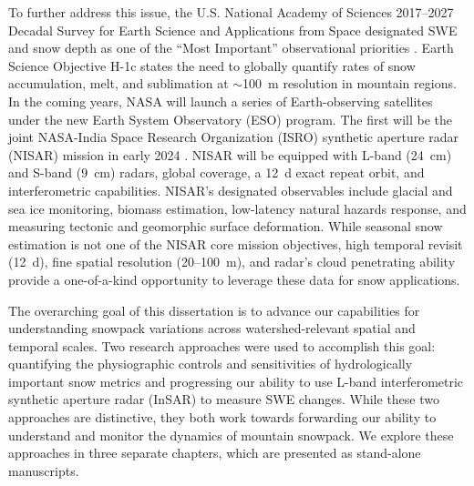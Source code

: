 To further address this issue, the U.S. National Academy of Sciences 2017--2027 Decadal Survey for Earth Science and Applications from Space designated SWE and snow depth as one of the ``Most Important” observational priorities \citep{nationalacademiesofsciencesengineeringandmedicineThrivingOurChanging2019}. Earth Science Objective H-1c states the need to globally quantify rates of snow accumulation, melt, and sublimation at $\sim$100~m resolution in mountain regions. In the coming years, NASA will launch a series of Earth-observing satellites under the new Earth System Observatory (ESO) program. The first will be the joint NASA-India Space Research Organization (ISRO) synthetic aperture radar (NISAR) mission in early 2024 \citep{rosenNASAISROSARNISAR2017, kelloggNASAISROSyntheticAperture2020}. NISAR will be equipped with L-band (24~cm) and S-band (9~cm) radars, global coverage, a 12~d exact repeat orbit, and interferometric capabilities. NISAR's designated observables include glacial and sea ice monitoring, biomass estimation, low-latency natural hazards response, and measuring tectonic and geomorphic surface deformation. While seasonal snow estimation is not one of the NISAR core mission objectives, high temporal revisit (12~d), fine spatial resolution (20--100~m), and radar's cloud penetrating ability provide a one-of-a-kind opportunity to leverage these data for snow applications.

The overarching goal of this dissertation is to advance our capabilities for understanding snowpack variations across watershed-relevant spatial and temporal scales. Two research approaches were used to accomplish this goal: quantifying the physiographic controls and sensitivities of hydrologically important snow metrics and progressing our ability to use L-band interferometric synthetic aperture radar (InSAR) to measure SWE changes. While these two approaches are distinctive, they both work towards forwarding our ability to understand and monitor the dynamics of mountain snowpack. We explore these approaches in three separate chapters, which are presented as stand-alone manuscripts. 

